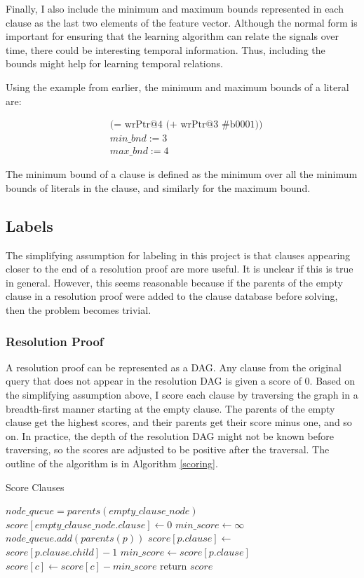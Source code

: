 \documentclass[letterpaper]{article} %
\begin{document}
Finally, I also include the minimum and maximum bounds represented in each clause as the last two elements of the feature vector. Although the normal form is important for ensuring that the learning algorithm can relate the signals over time, there could be interesting temporal information. Thus, including the bounds might help for learning temporal relations.

Using the example from earlier, the minimum and maximum bounds of a literal are:

\begin{equation*}
\begin{split}
&\text{(= wrPtr@4 (+ wrPtr@3 \#b0001))} \\
&min\_bnd := 3 \\
&max\_bnd := 4
\end{split}
\end{equation*}

The minimum bound of a clause is defined as the minimum over all the minimum bounds of literals in the clause, and similarly for the maximum bound.

\subsection{Labels}
The simplifying assumption for labeling in this project is that clauses appearing closer to the end of a resolution proof are more useful. It is unclear if this is true in general. However, this seems reasonable because if the parents of the empty clause in a resolution proof were added to the clause database before solving, then the problem becomes trivial. 
\subsubsection{Resolution Proof}
A resolution proof can be represented as a DAG. Any clause from the original query that does not appear in the resolution DAG is given a score of $0$. Based on the simplifying assumption above, I score each clause by traversing the graph in a breadth-first manner starting at the empty clause. The parents of the empty clause get the highest scores, and their parents get their score minus one, and so on. In practice, the depth of the resolution DAG might not be known before traversing, so the scores are adjusted to be positive after the traversal. The outline of the algorithm is in Algorithm \ref{scoring}.

\begin{algorithm}
\caption{Score Clauses}\label{scoring}
\begin{algorithmic}[1]
\State $node\_queue = parents(empty\_clause\_node)$
\State $score[empty\_clause\_node.clause] \gets 0$
\State $min\_score \gets \infty$
\State $node\_queue.add(parents(p))$
\State $score[p.clause] \gets $
\State \ \ \ \ \ \ \ \ \ $score[p.clause.child] - 1$
\State $min\_score \gets score[p.clause]$
\EndIf
\EndFor
{}
\State $score[c] \gets score[c] - min\_score$
\EndFor
\State return $score$
\EndProcedure
\end{algorithmic}
\end{algorithm} 
\end{document}
